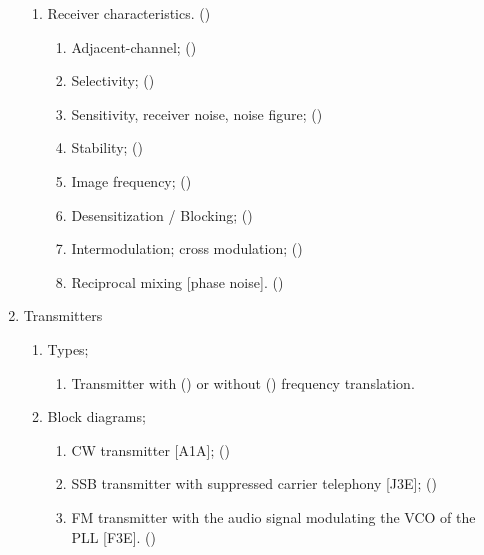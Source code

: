 \begin{flushleft}
\begin{enumerate}
\begin{enumerate}
\item Receiver characteristics. ()\label{HAREC.a.4.4}
\begin{enumerate}
\item Adjacent-channel; ()\label{HAREC.a.4.4.1}
\item Selectivity; ()\label{HAREC.a.4.4.2}
\item Sensitivity, receiver noise, noise figure;
  ()\label{HAREC.a.4.4.3}
\item Stability; ()\label{HAREC.a.4.4.4}
\item Image frequency; ()\label{HAREC.a.4.4.5}
\item Desensitization / Blocking; ()\label{HAREC.a.4.4.6}
\item Intermodulation; cross modulation;
  ()\label{HAREC.a.4.4.7}
\item Reciprocal mixing [phase noise].
  ()\label{HAREC.a.4.4.8}
\end{enumerate}
\end{enumerate}

\item Transmitters
\begin{enumerate}
\item Types;

\begin{enumerate}
\item Transmitter with ()\label{HAREC.a.5.1.1a}
  or without ()\label{HAREC.a.5.1.1b}
  frequency translation.
\end{enumerate}

\item Block diagrams;
\begin{enumerate}
\item CW transmitter [A1A]; ()\label{HAREC.a.5.2.1}
\item SSB transmitter with suppressed carrier telephony [J3E];
  ()\label{HAREC.a.5.2.2}
\item FM transmitter with the audio signal modulating the VCO of the PLL [F3E].
  ()\label{HAREC.a.5.2.3}
\end{enumerate}


\end{enumerate}
\end{enumerate}
\end{flushleft}
